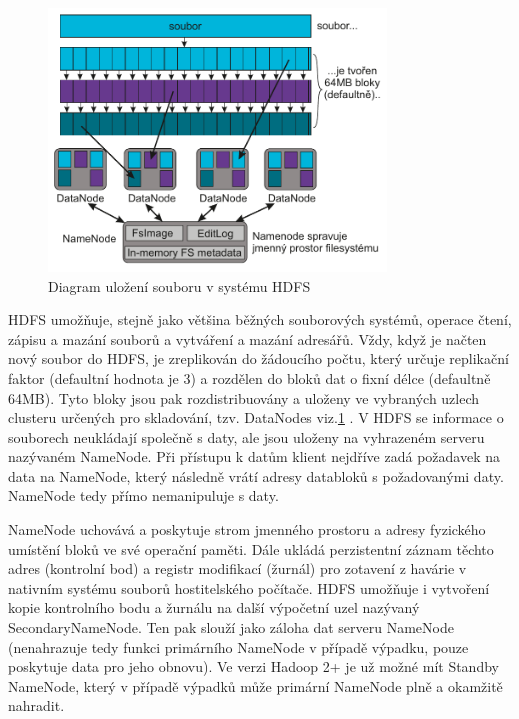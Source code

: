 \documentclass[thesis=M,czech]{FITthesis}[2012/06/26]
\begin{document}
\begin{figure}[h]\centering
	\includegraphics[width=0.8\textwidth, angle=0]{files/hdfs}
	\caption[Diagram uložení souboru v systému HDFS]{Diagram uložení souboru v systému HDFS}\label{fig:hdfs}
\end{figure}

HDFS umožňuje, stejně jako většina běžných souborových systémů, operace čtení, zápisu a mazání souborů a vytváření a mazání adresářů. Vždy, když je načten nový soubor do HDFS, je zreplikován do žádoucího počtu, který určuje replikační faktor (defaultní hodnota je 3) a rozdělen do bloků dat o fixní délce (defaultně 64MB). Tyto bloky jsou pak rozdistribuovány a uloženy  ve vybraných uzlech clusteru určených pro skladování, tzv. DataNodes viz.\ref{fig:hdfs} . V HDFS se informace o souborech neukládají společně s daty, ale jsou uloženy na vyhrazeném serveru nazývaném NameNode. Při přístupu k datům klient nejdříve zadá požadavek na data na NameNode, který následně vrátí adresy databloků s požadovanými daty. NameNode tedy přímo nemanipuluje s daty.

NameNode uchovává a poskytuje strom jmenného prostoru a adresy fyzického umístění bloků ve své operační paměti. Dále ukládá perzistentní záznam těchto adres (kontrolní bod) a registr modifikací (žurnál) pro zotavení z havárie v nativním systému souborů hostitelského počítače. HDFS umožňuje i  vytvoření kopie kontrolního bodu a žurnálu na další výpočetní uzel nazývaný SecondaryNameNode. Ten pak slouží jako záloha dat serveru NameNode  (nenahrazuje tedy funkci primárního NameNode v případě výpadku, pouze poskytuje data pro jeho obnovu). Ve verzi Hadoop 2+ je už možné mít Standby NameNode, který v případě výpadků může primární NameNode plně a okamžitě nahradit. 
\end{document}
